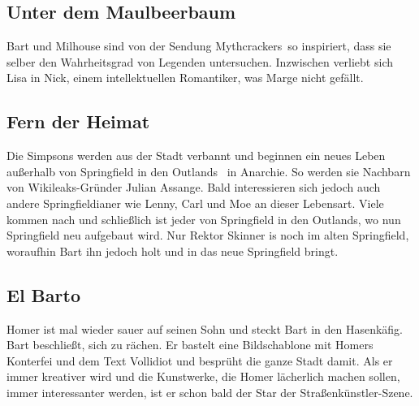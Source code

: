 \subsection{Unter dem Maulbeerbaum}
Bart und Milhouse sind von der Sendung \glqq Mythcrackers\grqq\ so inspiriert, dass sie selber den Wahrheitsgrad von Legenden untersuchen. Inzwischen verliebt sich Lisa in Nick, einem intellektuellen Romantiker, was Marge nicht gefällt.


\subsection{Fern der Heimat}
Die Simpsons werden aus der Stadt verbannt und beginnen ein neues Leben außerhalb von Springfield in den \glqq Outlands\grqq\  in Anarchie. So werden sie Nachbarn von Wikileaks-Gründer Julian Assange. Bald interessieren sich jedoch auch andere Springfieldianer wie Lenny, Carl und Moe an dieser Lebensart. Viele kommen nach und schließlich ist jeder von Springfield in den Outlands, wo nun Springfield neu aufgebaut wird. Nur Rektor Skinner is noch im alten Springfield, woraufhin Bart ihn jedoch holt und in das neue Springfield bringt. 


\subsection{El Barto}
Homer ist mal wieder sauer auf seinen Sohn und steckt Bart in den Hasenkäfig. Bart beschließt, sich zu rächen. Er bastelt eine Bildschablone mit Homers Konterfei und dem Text Vollidiot und besprüht die ganze Stadt damit. Als er immer kreativer wird und die Kunstwerke, die Homer lächerlich machen sollen, immer interessanter werden, ist er schon bald der Star der Straßenkünstler-Szene.

